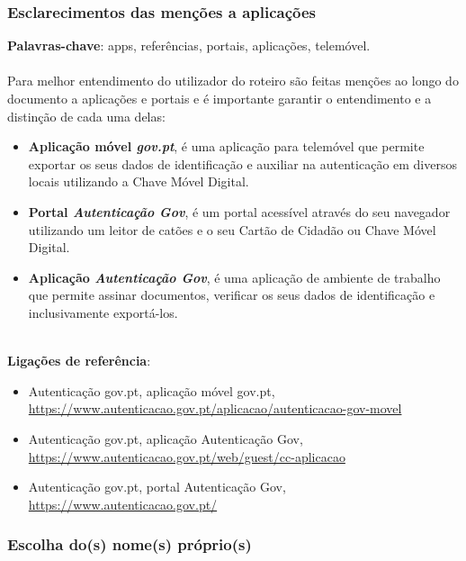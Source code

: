 \subsubsection{Esclarecimentos das menções a aplicações}

\textbf{Palavras-chave}: apps, referências, portais, aplicações, telemóvel. \\
\\
Para melhor entendimento do utilizador do roteiro são feitas menções ao
longo do documento a aplicações e portais e é importante garantir o
entendimento e a distinção de cada uma delas:
\begin{itemize}
	\item \textbf{Aplicação móvel \emph{gov.pt}}, é uma aplicação para telemóvel que permite exportar os seus dados de identificação e auxiliar na autenticação em diversos locais utilizando a Chave Móvel Digital.
	\item \textbf{Portal \emph{Autenticação Gov}}, é um portal acessível através do seu navegador utilizando um leitor de catões e o seu Cartão de Cidadão ou Chave Móvel Digital.
	\item \textbf{Aplicação \emph{Autenticação Gov}}, é uma aplicação de ambiente de trabalho que permite assinar documentos, verificar os seus dados de identificação e inclusivamente exportá-los.
\end{itemize}
\leavevmode\\
\textbf{Ligações de referência}:
\begin{itemize}
	\item Autenticação gov.pt, aplicação móvel gov.pt, \url{https://www.autenticacao.gov.pt/aplicacao/autenticacao-gov-movel}
	\item Autenticação gov.pt, aplicação Autenticação Gov, \url{https://www.autenticacao.gov.pt/web/guest/cc-aplicacao}
	\item Autenticação gov.pt, portal Autenticação Gov, \url{https://www.autenticacao.gov.pt/}
\end{itemize}

\subsubsection{Escolha do(s) nome(s) próprio(s)}

